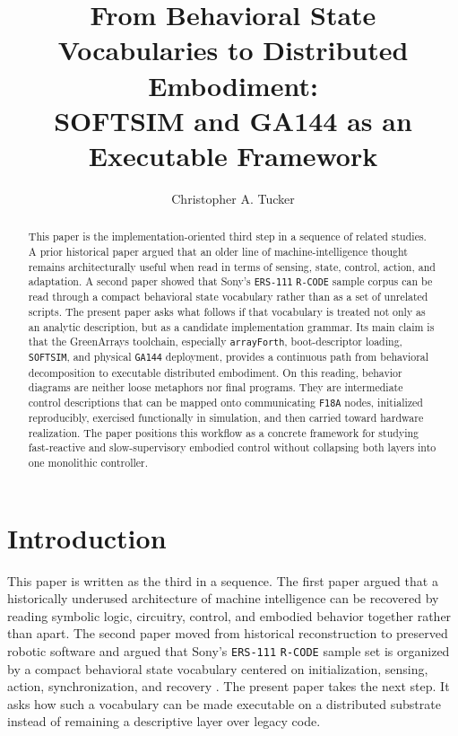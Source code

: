\documentclass[11pt]{article}
\title{From Behavioral State Vocabularies to Distributed Embodiment:\\
SOFTSIM and GA144 as an Executable Framework}
\author{Christopher A. Tucker}
\date{}
\begin{document}
\maketitle

\begin{abstract}
This paper is the implementation-oriented third step in a sequence of
related studies. A prior historical paper argued that an older line of
machine-intelligence thought remains architecturally useful when read in
terms of sensing, state, control, action, and adaptation. A second paper
showed that Sony's \texttt{ERS-111} \texttt{R-CODE} sample corpus can be
read through a compact behavioral state vocabulary rather than as a set of
unrelated scripts. The present paper asks what follows if that vocabulary is
treated not only as an analytic description, but as a candidate
implementation grammar. Its main claim is that the GreenArrays toolchain,
especially \texttt{arrayForth}, boot-descriptor loading, \texttt{SOFTSIM},
and physical \texttt{GA144} deployment, provides a continuous path from
behavioral decomposition to executable distributed embodiment. On this
reading, behavior diagrams are neither loose metaphors nor final programs.
They are intermediate control descriptions that can be mapped onto
communicating \texttt{F18A} nodes, initialized reproducibly, exercised
functionally in simulation, and then carried toward hardware realization.
The paper positions this workflow as a concrete framework for studying
fast-reactive and slow-supervisory embodied control without collapsing both
layers into one monolithic controller.
\end{abstract}

\onehalfspacing

\section{Introduction}

This paper is written as the third in a sequence. The first paper argued
that a historically underused architecture of machine intelligence can be
recovered by reading symbolic logic, circuitry, control, and embodied
behavior together rather than apart. The second paper moved from historical
reconstruction to preserved robotic software and argued that Sony's
\texttt{ERS-111} \texttt{R-CODE} sample set is organized by a compact
behavioral state vocabulary centered on initialization, sensing, action,
synchronization, and recovery \citep{tucker2026behavioral}. The present
paper takes the next step. It asks how such a vocabulary can be made
executable on a distributed substrate instead of remaining a descriptive
layer over legacy code.
\end{document}
